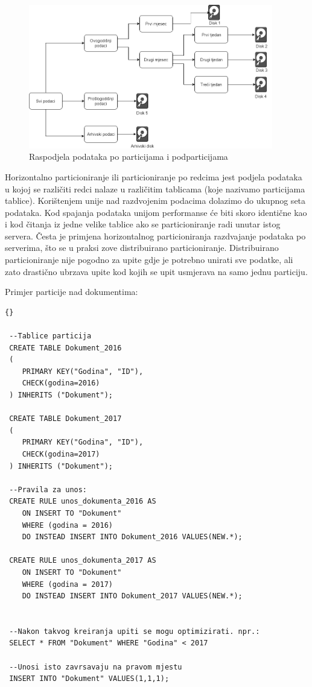 \documentclass[a4paper,12pt]{foi}
\begin{document}
\begin{figure}[h]
\centering 
\includegraphics[width=0.95\textwidth]{particioniranje.png}
\caption{Raspodjela podataka po particijama i podparticijama}
\label{slika-2}
\end{figure}

Horizontalno particioniranje ili particioniranje po redcima jest
podjela podataka u kojoj se različiti redci nalaze u različitim tablicama
(koje nazivamo particijama tablice). Korištenjem unije
nad razdvojenim podacima dolazimo do ukupnog seta podataka.
Kod spajanja podataka unijom performanse će biti skoro identične
kao i kod čitanja iz jedne velike tablice ako se particioniranje radi
unutar istog servera. Česta je primjena horizontalnog particioniranja
razdvajanje podataka po serverima, što se u praksi zove distribuirano
particioniranje. Distribuirano particioniranje nije pogodno
za upite gdje je potrebno unirati sve podatke, ali zato drastično
ubrzava upite kod kojih se upit usmjerava na samo jednu particiju.

Primjer particije nad dokumentima: 


\lstset{commentstyle=\textit,language=SQL}
\begin{lstlisting}[frame=tb]{}

 --Tablice particija
 CREATE TABLE Dokument_2016
 (
 	PRIMARY KEY("Godina", "ID"),
 	CHECK(godina=2016)
 ) INHERITS ("Dokument");

 CREATE TABLE Dokument_2017
 (
 	PRIMARY KEY("Godina", "ID"),
 	CHECK(godina=2017)
 ) INHERITS ("Dokument");

 --Pravila za unos:
 CREATE RULE unos_dokumenta_2016 AS
	ON INSERT TO "Dokument"
 	WHERE (godina = 2016)
 	DO INSTEAD INSERT INTO Dokument_2016 VALUES(NEW.*);
 
 CREATE RULE unos_dokumenta_2017 AS
 	ON INSERT TO "Dokument"
 	WHERE (godina = 2017)
 	DO INSTEAD INSERT INTO Dokument_2017 VALUES(NEW.*);


 --Nakon takvog kreiranja upiti se mogu optimizirati. npr.:
 SELECT * FROM "Dokument" WHERE "Godina" < 2017

 --Unosi isto zavrsavaju na pravom mjestu  
 INSERT INTO "Dokument" VALUES(1,1,1);
\end{lstlisting}
\end{document}
